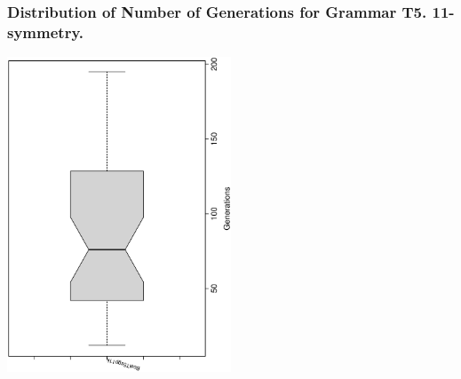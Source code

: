  \begin{frame}
 \frametitle{ Distribution of Number of Generations for Grammar T5. 11-symmetry. }
 \begin{center}
\includegraphics[width=0.5\textwidth, angle=-90]
{ExpFboxplottGenerations009.eps}
 \end{center}
 \label{ExpFboxplottGenerations009.eps}  
 \end{frame}

